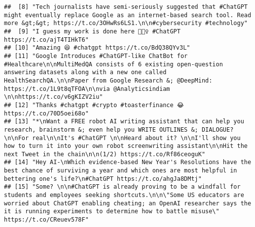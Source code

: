 \documentclass[
]{article}
\begin{document}
\begin{verbatim}
##  [8] "Tech journalists have semi-seriously suggested that #ChatGPT might eventually replace Google as an internet-based search tool. Read more &gt;&gt; https://t.co/3OHwRs6LS1.\n\n#cybersecurity #technology"                                                                                                                       
##  [9] "I guess my work is done here 🤷🏻‍♀️ #ChatGPT https://t.co/ajT4TIHkT6"                                                                                                                                                                                                                                                            
## [10] "Amazing 😆 #chatgpt https://t.co/BdQ38QYv3L"                                                                                                                                                                                                                                                                                    
## [11] "Google Introduces #ChatGPT-like ChatBot for #Healthcare\n\nMultiMedQA consists of 6 existing open-question answering datasets along with a new one called HealthSearchQA.\n\nPaper from Google Research &; @DeepMind: https://t.co/1L9t8qTFOA\n\nvia @Analyticsindiam \n\nhttps://t.co/v6gKIZV2iu"                              
## [12] "Thanks #chatgpt #crypto #toasterfinance 😂 https://t.co/70D5oei68o"                                                                                                                                                                                                                                                             
## [13] "*\nWant a FREE robot AI writing assistant that can help you research, brainstorm &; even help you WRITE OUTLINES &; DIALOGUE?\n\nFor real\n\nIt's #ChatGPT \n\nHeard about it? \n\nI'll show you how to turn it into your own robot screenwriting assistant\n\nHit the next Tweet in the chain\n\n(1/2) https://t.co/Rf86ceoguK"
## [14] "Hey AI-\nWhich evidence-based New Year's Resolutions have the best chance of surviving a year and which ones are most helpful in bettering one's life?\n#ChatGPT https://t.co/ahgJa8DMtj"                                                                                                                                       
## [15] "Some? \n\n#ChatGPT is already proving to be a windfall for students and employees seeking shortcuts.\n\n\"Some US educators are worried about ChatGPT enabling cheating; an OpenAI researcher says the it is running experiments to determine how to battle misuse\" https://t.co/CReuev578F"                                   

\end{verbatim}
\end{document}
